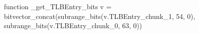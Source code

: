 function _get_TLBEntry_bits v = bitvector_concat(subrange_bits(v.TLBEntry_chunk_1, 54, 0), subrange_bits(v.TLBEntry_chunk_0, 63, 0))
